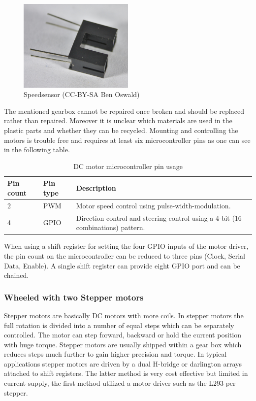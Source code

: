\documentclass[11pt,a4paper]{article}
\begin{document}
\begin{figure}[h!]
  \centering
  \includegraphics[width=0.5\textwidth]{images/30_speedsensor.jpg}
  \caption{Speedsensor (CC-BY-SA Ben Oswald)}
\end{figure}

The mentioned gearbox cannot be repaired once broken and should be replaced rather than repaired. Moreover it is unclear which materials are used in the plastic parts and whether they can be recycled. Mounting and controlling the motors is trouble free and requires at least six microcontroller pins as one can see in the following table.

\begin{table}[h!]
\centering
\begin{tabular}{p{}p{}p{}}
\toprule
Pin count & Pin type & Description \\
\midrule
2 & PWM  & Motor speed control using pulse-width-modulation.\\
4 & GPIO & Direction control and steering control using a 4-bit (16 combinations) pattern.\\
\bottomrule
\end{tabular}
\caption{DC motor microcontroller pin usage}
\label{tbl:dc_pin}
\end{table}

When using a shift register for setting the four GPIO inputs of the motor driver, the pin count on the microcontroller can be reduced to three pins (Clock, Serial Data, Enable).  A single shift register can provide eight GPIO port and can be chained. 


\subsubsection{Wheeled with two Stepper motors}
Stepper motors are basically DC motors with more coils. In stepper motors the full rotation is divided into a number of equal steps which can be separately controlled. The motor can step forward, backward or hold the current position with huge torque. Stepper motors are usually shipped within a gear box which reduces steps much further to gain higher precision and torque. 
In typical applications stepper motors are driven by a dual H-bridge or darlington arrays attached to shift registers. The latter method is very cost effective but limited in current supply, the first method utilized a motor driver such as the L293 per stepper.
\end{document}
